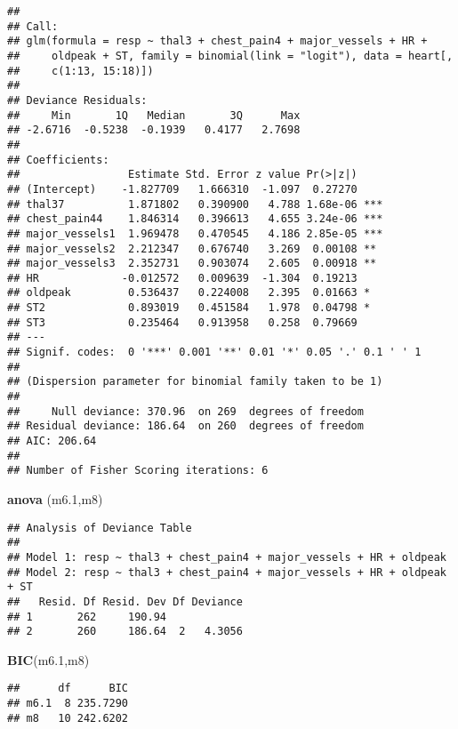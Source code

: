 \documentclass[]{article}
\newenvironment{Shaded}{\begin{snugshade}}{\end{snugshade}}
\newcommand{\KeywordTok}[1]{\textcolor[rgb]{0.13,0.29,0.53}{\textbf{#1}}}
\newcommand{\DecValTok}[1]{\textcolor[rgb]{0.00,0.00,0.81}{#1}}
\newcommand{\NormalTok}[1]{#1}
\begin{document}
\begin{verbatim}
## 
## Call:
## glm(formula = resp ~ thal3 + chest_pain4 + major_vessels + HR + 
##     oldpeak + ST, family = binomial(link = "logit"), data = heart[, 
##     c(1:13, 15:18)])
## 
## Deviance Residuals: 
##     Min       1Q   Median       3Q      Max  
## -2.6716  -0.5238  -0.1939   0.4177   2.7698  
## 
## Coefficients:
##                 Estimate Std. Error z value Pr(>|z|)    
## (Intercept)    -1.827709   1.666310  -1.097  0.27270    
## thal37          1.871802   0.390900   4.788 1.68e-06 ***
## chest_pain44    1.846314   0.396613   4.655 3.24e-06 ***
## major_vessels1  1.969478   0.470545   4.186 2.85e-05 ***
## major_vessels2  2.212347   0.676740   3.269  0.00108 ** 
## major_vessels3  2.352731   0.903074   2.605  0.00918 ** 
## HR             -0.012572   0.009639  -1.304  0.19213    
## oldpeak         0.536437   0.224008   2.395  0.01663 *  
## ST2             0.893019   0.451584   1.978  0.04798 *  
## ST3             0.235464   0.913958   0.258  0.79669    
## ---
## Signif. codes:  0 '***' 0.001 '**' 0.01 '*' 0.05 '.' 0.1 ' ' 1
## 
## (Dispersion parameter for binomial family taken to be 1)
## 
##     Null deviance: 370.96  on 269  degrees of freedom
## Residual deviance: 186.64  on 260  degrees of freedom
## AIC: 206.64
## 
## Number of Fisher Scoring iterations: 6
\end{verbatim}

\begin{Shaded}
\begin{Highlighting}[]
\KeywordTok{anova}\NormalTok{ (m6.}\DecValTok{1}\NormalTok{,m8)}
\end{Highlighting}
\end{Shaded}

\begin{verbatim}
## Analysis of Deviance Table
## 
## Model 1: resp ~ thal3 + chest_pain4 + major_vessels + HR + oldpeak
## Model 2: resp ~ thal3 + chest_pain4 + major_vessels + HR + oldpeak + ST
##   Resid. Df Resid. Dev Df Deviance
## 1       262     190.94            
## 2       260     186.64  2   4.3056
\end{verbatim}

\begin{Shaded}
\begin{Highlighting}[]
\KeywordTok{BIC}\NormalTok{(m6.}\DecValTok{1}\NormalTok{,m8)}
\end{Highlighting}
\end{Shaded}

\begin{verbatim}
##      df      BIC
## m6.1  8 235.7290
## m8   10 242.6202
\end{verbatim}
\end{document}
